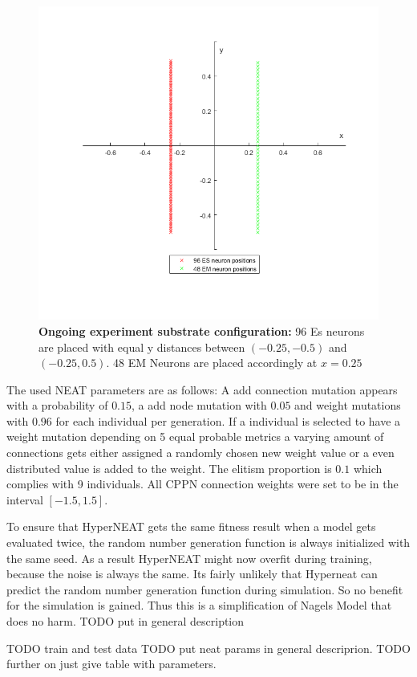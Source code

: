 \begin{figure}[tb]
	\centering
	\includegraphics[width=0.7\linewidth]{figures/OngoingModel/OngoingSubstrate}
	\caption[Ongoing experiment substrate configuration]{\textbf{Ongoing experiment substrate configuration:} 96 Es neurons are placed with equal y distances between $(-0.25,-0.5)$ and $(-0.25,0.5)$. 48 EM Neurons are placed accordingly at $x=0.25$}
	\label{fig:ongoingsubstrate}
\end{figure}

The used NEAT parameters are as follows: A add connection mutation appears with a probability  of $0.15$, a add node mutation with $0.05$ and weight mutations with $0.96$ for each individual per generation. If a individual is selected to have a weight mutation depending on 5 equal probable metrics a varying amount of connections gets either assigned a randomly chosen new weight value or a even distributed value is added to the weight. The elitism proportion is $0.1$ which complies with 9 individuals. All CPPN connection weights were set to be in the interval $[-1.5,1.5]$.

To ensure that HyperNEAT gets the same fitness result when a model gets evaluated twice, the random number generation function is always initialized with the same seed. As a result HyperNEAT might now overfit during training, because the noise is always the same. Its fairly unlikely that Hyperneat can predict the random number generation function during simulation. So no benefit for the simulation is gained. Thus this is a simplification of Nagels Model that does no harm. TODO put in general description

TODO train and test data
TODO put neat params in general descriprion. 
TODO further on just give table with parameters.
